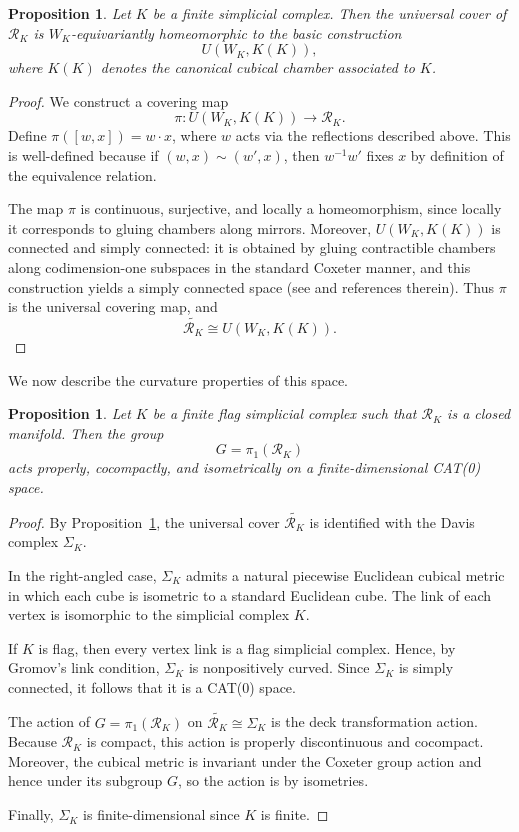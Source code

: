 \documentclass[11pt,a4paper]{article}
\numberwithin{equation}{section}
\newtheorem{prop}[definition]{Proposition}
\theoremstyle{named}
\begin{document}
\begin{prop}
\label{prop:universal-cover-davis}
Let $K$ be a finite simplicial complex. Then the universal cover of $\mathcal{R}_K$ is $W_K$-equivariantly homeomorphic to the basic construction
\[
U(W_K,K(K)),
\]
where $K(K)$ denotes the canonical cubical chamber associated to $K$.
\end{prop}

\begin{proof}
We construct a covering map
\[
\pi : U(W_K,K(K)) \longrightarrow \mathcal{R}_K.
\]
Define $\pi([w,x]) = w \cdot x$, where $w$ acts via the reflections described above. This is well-defined because if $(w,x) \sim (w',x)$, then $w^{-1}w'$ fixes $x$ by definition of the equivalence relation.

The map $\pi$ is continuous, surjective, and locally a homeomorphism, since locally it corresponds to gluing chambers along mirrors. Moreover, $U(W_K,K(K))$ is connected and simply connected: it is obtained by gluing contractible chambers along codimension-one subspaces in the standard Coxeter manner, and this construction yields a simply connected space (see \cite[Example 2.2]{rafca} and references therein). Thus $\pi$ is the universal covering map, and
\[
\widetilde{\mathcal{R}_K} \cong U(W_K,K(K)).
\]
\end{proof}

\medskip

We now describe the curvature properties of this space.

\begin{prop}
\label{prop:cat0_action}
Let $K$ be a finite flag simplicial complex such that $\mathcal{R}_K$ is a closed manifold. Then the group
\[
G=\pi_1(\mathcal{R}_K)
\]
acts properly, cocompactly, and isometrically on a finite-dimensional CAT(0) space.
\end{prop}
\begin{proof}
By Proposition~\ref{prop:universal-cover-davis}, the universal cover $\widetilde{\mathcal{R}_K}$ is identified with the Davis complex $\Sigma_K$.

In the right-angled case, $\Sigma_K$ admits a natural piecewise Euclidean cubical metric in which each cube is isometric to a standard Euclidean cube. The link of each vertex is isomorphic to the simplicial complex $K$.

If $K$ is flag, then every vertex link is a flag simplicial complex. Hence, by Gromov's link condition, $\Sigma_K$ is nonpositively curved. Since $\Sigma_K$ is simply connected, it follows that it is a CAT(0) space.

The action of $G=\pi_1(\mathcal{R}_K)$ on $\widetilde{\mathcal{R}_K} \cong \Sigma_K$ is the deck transformation action. Because $\mathcal{R}_K$ is compact, this action is properly discontinuous and cocompact. Moreover, the cubical metric is invariant under the Coxeter group action and hence under its subgroup $G$, so the action is by isometries.

Finally, $\Sigma_K$ is finite-dimensional since $K$ is finite.
\end{proof}
\end{document}
